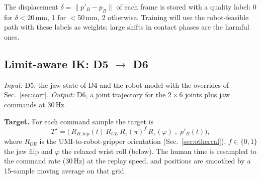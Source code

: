 \documentclass[conference,10pt]{IEEEtran}
\newcommand{\mm}{\,mm\xspace}
\begin{document}
The displacement $\delta=\lVert p'_B-p_B\rVert$ of each frame is stored with a quality label: 0 for $\delta<20$\mm, 1 for
$<$50\mm, 2 otherwise. Training will use the robot-feasible path with these labels as weights; large shifts in contact
phases are the harmful ones.

\subsection{Limit-aware IK: D5 $\to$ D6}\label{sec:plan}
\emph{Input:} D5, the jaw state of D4 and the robot model with the overrides of Sec.~\ref{sec:corr}. \emph{Output:} D6, a
joint trajectory for the $2\times6$ joints plus jaw commands at 30\,Hz.
\par\noindent{}\par

\textbf{Target.} For each command sample the target is
\begin{equation}
T^\star=\Big(\,R_{B,\mathrm{tcp}}(t)\,R_{UE}\,R_z(\pi)^{f}\,R_z(\varphi)\;,\;p'_B(t)\Big),
\end{equation}
where $R_{UE}$ is the UMI-to-robot-gripper orientation (Sec.~\ref{sec:othercal}), $f\in\{0,1\}$ the jaw flip and $\varphi$
the relaxed wrist roll (below). The human time is resampled to the command rate (30\,Hz) at the replay speed, and
positions are smoothed by a 15-sample moving average on that grid.
\end{document}
